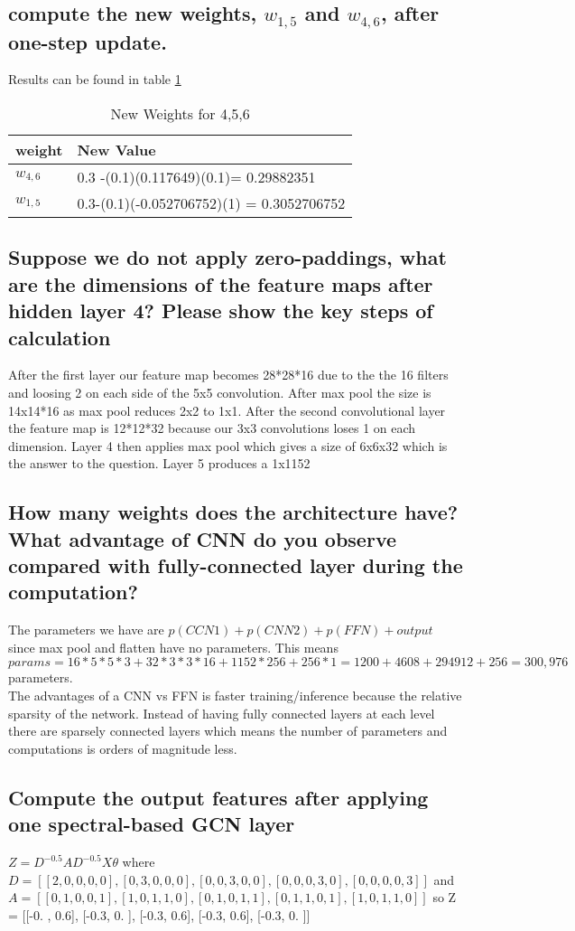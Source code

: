 \documentclass[11pt]{article}
\begin{document}
\subsection{compute the new weights, $w_{1,5}$ and $w_{4,6}$, after one-step update.}
Results can be found in table \ref{tab:newweight}
\begin{table}[]
\begin{tabular}{|l|l|} \hline
weight & New Value \\ \hline
$w_{4,6}$ & 0.3 -(0.1)(0.117649)(0.1)= 0.29882351\\ \hline 
$w_{1,5}$ & 0.3-(0.1)(-0.052706752)(1) = 0.3052706752 \\ \hline
\end{tabular}
\caption{New Weights for 4,5,6}
\label{tab:newweight}
\end{table}
\subsection{Suppose we do not apply zero-paddings, what are the dimensions of the feature maps after hidden layer 4? Please show the key steps of calculation}
After the first layer our feature map becomes 28*28*16 due to the the 16 filters and loosing 2 on each side of the 5x5 convolution. After max pool the size is 14x14*16 as max pool reduces 2x2 to 1x1. After the second convolutional layer the feature map is 12*12*32 because our 3x3 convolutions loses 1 on each dimension. Layer 4 then applies max pool which gives a size of 6x6x32 which is the answer to the question. Layer 5 produces a 1x1152
\subsection{How many weights does the architecture have? What advantage of CNN do you observe compared with fully-connected layer during the computation?}
The parameters we have are $p(CCN1) + p(CNN2) +p(FFN) + output$ since max pool and flatten have no parameters. This means $params = 16*5*5*3+32*3*3*16+1152*256+256*1= 1200+4608+294912+256 = 300,976$ parameters. \\ The advantages of a CNN vs FFN is faster training/inference because the relative sparsity of the network. Instead of having fully connected layers at each level there are sparsely connected layers which means the number of parameters and computations is orders of magnitude less.
\subsection{ Compute the output features after applying one spectral-based GCN layer}
$Z = D^{-0.5}AD^{-0.5}X\theta$ where $D = [[2,0,0,0,0],[0,3,0,0,0],[0,0,3,0,0],[0,0,0,3,0],[0,0,0,0,3]]$ and $A=[[0,1,0,0,1],[1,0,1,1,0],[0,1,0,1,1],[0,1,1,0,1],[1,0,1,1,0]]$ so Z = [[-0. ,  0.6],
       [-0.3,  0. ],
       [-0.3,  0.6],
       [-0.3,  0.6],
       [-0.3,  0. ]]
\end{document}
